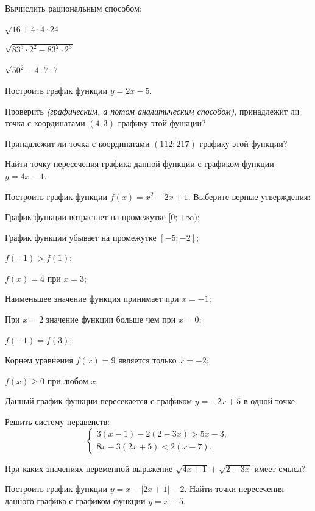 %
%
%
%
\begin{class}[number=1]
	\begin{listofex}
		\item Вычислить рациональным способом:
		\begin{enumcols}[itemcolumns=3]
			\item \( \sqrt{16+4\cdot4\cdot24} \)
			\item \( \sqrt{83^3\cdot2^2-83^2\cdot2^3} \)
			\item \( \sqrt{50^2-4\cdot7\cdot7} \)
		\end{enumcols}
		\item Построить график функции \( y=2x-5 \).
		\begin{enumcols}[itemcolumns=1]
			\item Проверить \textit{(графическим, а потом аналитическим способом)}, принадлежит ли точка с координатами \( (4;3) \) графику этой функции?
			\item Принадлежит ли точка с координатами \( (112;217) \) графику этой функции?
			\item Найти точку пересечения графика данной функции с графиком функции \( y=4x-1 \).
		\end{enumcols}
		\item Построить график функции \( f(x)=x^2-2x+1 \). Выберите верные утверждения:
		\begin{enumcols}[itemcolumns=1]
			\item График функции возрастает на промежутке \( [0;+\infty) \);
			\item График функции убывает на промежутке \( [-5;-2] \);
			\item \( f(-1)>f(1) \);
			\item \( f(x)=4 \) при \( x=3 \);
			\item Наименьшее значение функция принимает при \( x=-1 \);
			\item При \( x=2 \) значение функции больше чем при \( x=0 \);
			\item \( f(-1)=f(3) \);
			\item Корнем уравнения \( f(x)=9 \) является только \( x=-2 \);
			\item \( f(x)\ge0 \) при любом \( x \);
			\item Данный график функции пересекается с графиком \( y=-2x+5 \) в одной точке.
		\end{enumcols}
		\item Решить систему неравенств:
		\[ \left\{
		\begin{array}{l}
			3(x-1)-2(2-3x)>5x-3,\\
			8x-3(2x+5)<2(x-7).
		\end{array}
		\right. \]
		\item При каких значениях переменной выражение \( \sqrt{4x+1}+\sqrt{2-3x} \) имеет смысл?
		\item Построить график функции \( y=x-|2x+1|-2 \). Найти точки пересечения данного графика с графиком функции \( y=x-5 \).
	\end{listofex}
\end{class}
